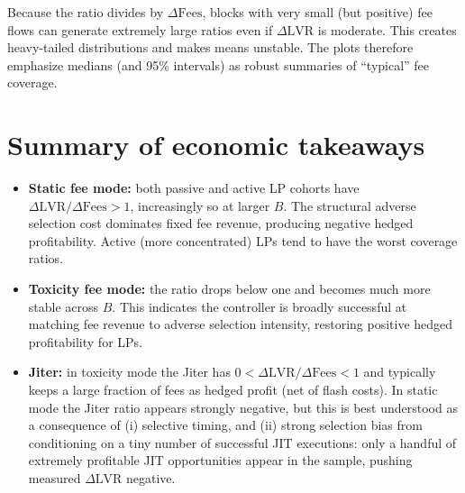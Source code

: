 \documentclass[11pt]{article}
\begin{document}
Because the ratio divides by $\Delta\mathrm{Fees}$, blocks with very small (but positive) fee flows can generate extremely large ratios
even if $\Delta\mathrm{LVR}$ is moderate. This creates heavy-tailed distributions and makes means unstable.
The plots therefore emphasize medians (and 95\% intervals) as robust summaries of ``typical'' fee coverage.

\section{Summary of economic takeaways}

\begin{itemize}
  \item \textbf{Static fee mode:} both passive and active LP cohorts have $\Delta\mathrm{LVR}/\Delta\mathrm{Fees}>1$, increasingly so at
        larger $B$. The structural adverse selection cost dominates fixed fee revenue, producing negative hedged profitability.
        Active (more concentrated) LPs tend to have the worst coverage ratios.
  \item \textbf{Toxicity fee mode:} the ratio drops below one and becomes much more stable across $B$. This indicates the controller
        is broadly successful at matching fee revenue to adverse selection intensity, restoring positive hedged profitability for LPs.
  \item \textbf{Jiter:} in toxicity mode the Jiter has $0<\Delta\mathrm{LVR}/\Delta\mathrm{Fees}<1$ and typically keeps a large fraction
        of fees as hedged profit (net of flash costs). In static mode the Jiter ratio appears strongly negative, but this is best
        understood as a consequence of (i) selective timing, and (ii) strong selection bias from conditioning on a tiny number of
        successful JIT executions: only a handful of extremely profitable JIT opportunities appear in the sample, pushing measured
        $\Delta\mathrm{LVR}$ negative.
\end{itemize}
\end{document}
